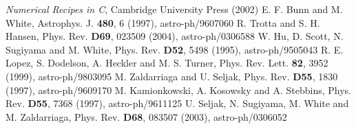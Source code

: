 \documentclass[twocolumn,nofootinbib,amsmath,amssymb]{revtex4}
\begin{document}
\begin{thebibliography}{10}
  \textit{Numerical Recipes in C}, Cambridge University Press (2002)
  E. F. Bunn and M. White,
  Astrophys. J. \textbf{480}, 6 (1997), astro-ph/9607060
  R. Trotta and S. H. Hansen,
  Phys. Rev. \textbf{D69}, 023509 (2004), astro-ph/0306588
  W. Hu, D. Scott, N. Sugiyama and M. White,
  Phys. Rev. \textbf{D52}, 5498 (1995), astro-ph/9505043
  R. E. Lopez, S. Dodelson, A. Heckler and M. S. Turner,
  Phys. Rev. Lett. \textbf{82}, 3952 (1999), astro-ph/9803095
  M. Zaldarriaga and U. Seljak,
  Phys. Rev. \textbf{D55}, 1830 (1997), astro-ph/9609170
  M. Kamionkowski, A. Kosowsky and A. Stebbins,
  Phys. Rev. \textbf{D55}, 7368 (1997), astro-ph/9611125
  U. Seljak, N. Sugiyama, M. White and M. Zaldarriaga,
  Phys. Rev. \textbf{D68}, 083507 (2003), astro-ph/0306052



\end{thebibliography}
\end{document}
